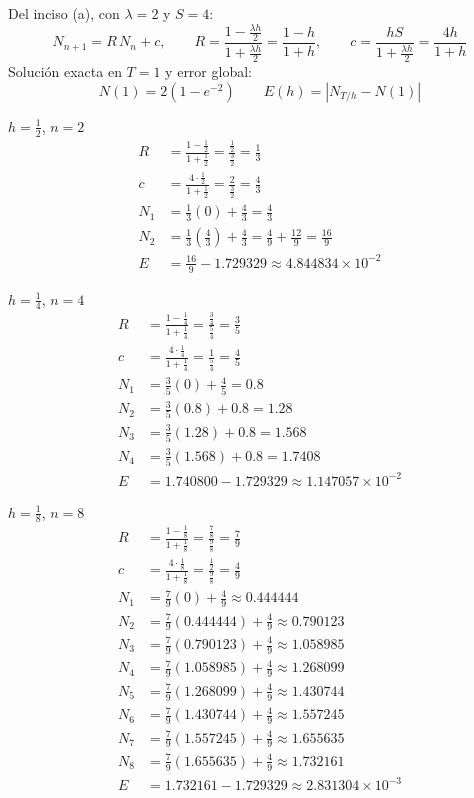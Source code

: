 Del inciso (a), con $\lambda = 2$ y $S = 4$:
\[
N_{n+1} = R\,N_n + c, \qquad
R = \frac{1 - \frac{\lambda h}{2}}{1 + \frac{\lambda h}{2}} = \frac{1 - h}{1 + h}, \qquad
c = \frac{hS}{1 + \frac{\lambda h}{2}} = \frac{4h}{1 + h}
\]
Solución exacta en $T = 1$ y error global:
\[
N(1) = 2\left(1 - e^{-2}\right) \qquad E(h) = \left|N_{T/h} - N(1)\right|
\]

$h = \tfrac12$, $n = 2$ 
\begin{align*}
	R &= \frac{1 - \frac12}{1 + \frac12} = \frac{\frac12}{\frac32} = \frac13\\
	c &= \frac{4\cdot\frac12}{1 + \frac12} = \frac{2}{\frac32} = \frac43\\
	N_1 &= \tfrac13(0) + \tfrac43 = \tfrac43 \\
	N_2 &= \tfrac13\left(\tfrac43\right) + \tfrac43 = \tfrac49 + \tfrac{12}{9} = \tfrac{16}{9} \\
	E &= \tfrac{16}{9} - 1.729329 \approx 4.844834\times10^{-2}
\end{align*}

$h = \tfrac14$, $n = 4$ 
\begin{align*}
	R &= \frac{1 - \frac14}{1 + \frac14} = \frac{\frac34}{\frac54} = \frac35\\
	c &= \frac{4\cdot\frac14}{1 + \frac14} = \frac{1}{\frac54} = \frac45\\
	N_1 &= \tfrac35(0) + \tfrac45 = 0.8\\
	N_2 &= \tfrac35(0.8) + 0.8 = 1.28\\
	N_3 &= \tfrac35(1.28) + 0.8 = 1.568\\
	N_4 &= \tfrac35(1.568) + 0.8 = 1.7408\\
	E &= 1.740800 - 1.729329 \approx 1.147057\times10^{-2}
\end{align*}

$h = \tfrac18$, $n = 8$
\begin{align*}
	R &= \frac{1 - \frac18}{1 + \frac18} = \frac{\frac78}{\frac98} = \frac79\\
	c &= \frac{4\cdot\frac18}{1 + \frac18} = \frac{\frac12}{\frac98} = \frac49\\
	N_1 &= \tfrac79(0) + \tfrac49 \approx 0.444444\\
	N_2 &= \tfrac79(0.444444) + \tfrac49 \approx 0.790123\\
	N_3 &= \tfrac79(0.790123) + \tfrac49 \approx 1.058985\\
	N_4 &= \tfrac79(1.058985) + \tfrac49 \approx 1.268099\\
	N_5 &= \tfrac79(1.268099) + \tfrac49 \approx 1.430744\\
	N_6 &= \tfrac79(1.430744) + \tfrac49 \approx 1.557245\\
	N_7 &= \tfrac79(1.557245) + \tfrac49 \approx 1.655635\\
	N_8 &= \tfrac79(1.655635) + \tfrac49 \approx 1.732161\\
	E &= 1.732161 - 1.729329 \approx 2.831304\times10^{-3}
\end{align*}

